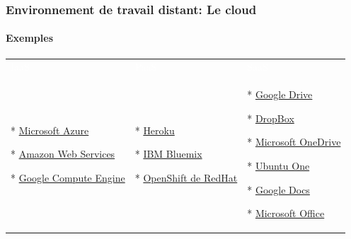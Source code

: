 \documentclass[xcolor=table]{beamer}
\begin{document}
\begin{frame}
\frametitle{Environnement de travail distant: Le cloud}
\framesubtitle{Exemples}

\begin{tabular}{p{}p{}p{}}
	\rowcolor{darkblue}
	\textcolor{white}{IaaS}  & \textcolor{white}{PaaS} & \textcolor{white}{SaaS} \\
	
	* \href{http://azure.microsoft.com/}{Microsoft Azure}
	
	* \href{https://aws.amazon.com}{Amazon Web Services}
	
	* \href{https://cloud.google.com/compute/}{Google Compute Engine}
	
	&
	
	* \href{https://www.heroku.com}{Heroku}
	
	* \href{https://www.ibm.com/cloud-computing/bluemix/}{IBM Bluemix}
	
	* \href{https://www.openshift.org/}{OpenShift de RedHat}
	
	&
	
	* \href{https://www.google.com/drive/}{Google Drive}
	
	* \href{https://www.dropbox.com/}{DropBox}
	
	* \href{https://onedrive.live.com/}{Microsoft OneDrive}
	
	* \href{http://one.ubuntu.com/}{Ubuntu One}
	 
	* \href{https://docs.google.com/}{Google Docs}
	
	* \href{https://microsoftonline.com}{Microsoft Office}
	\\
\end{tabular}


\end{frame}
\end{document}
